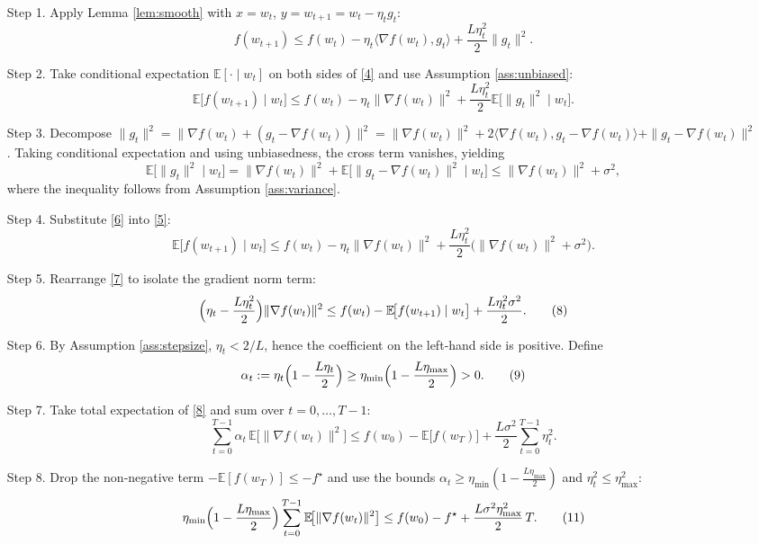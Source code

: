 \documentclass{article}
\newcommand{\E}{\mathbb{E}}
\begin{document}
\begin{enumerate}
\item[Step 1.] Apply Lemma \ref{lem:smooth} with $x=w_t$, $y=w_{t+1}=w_t-\eta_t g_t$:
\[
f(w_{t+1})\le f(w_t)-\eta_t\langle\nabla f(w_t),g_t\rangle
+\frac{L\eta_t^{2}}{2}\|g_t\|^{2}.
\tag{4}
\]

\item[Step 2.] Take conditional expectation $\E[\cdot\mid w_t]$ on both sides
of \eqref{4} and use Assumption \ref{ass:unbiased}:
\[
\E\!\big[f(w_{t+1})\mid w_t\big]
\le f(w_t)-\eta_t\|\nabla f(w_t)\|^{2}
+\frac{L\eta_t^{2}}{2}\E\!\big[\|g_t\|^{2}\mid w_t\big].
\tag{5}
\]

\item[Step 3.] Decompose $\|g_t\|^{2}
=\|\nabla f(w_t)+(g_t-\nabla f(w_t))\|^{2}
=\|\nabla f(w_t)\|^{2}+2\langle\nabla f(w_t),g_t-\nabla f(w_t)\rangle
+\|g_t-\nabla f(w_t)\|^{2}$.
Taking conditional expectation and using unbiasedness,
the cross term vanishes, yielding
\[
\E\!\big[\|g_t\|^{2}\mid w_t\big]
= \|\nabla f(w_t)\|^{2}
+ \E\!\big[\|g_t-\nabla f(w_t)\|^{2}\mid w_t\big]
\le \|\nabla f(w_t)\|^{2}+\sigma^{2},
\tag{6}
\]
where the inequality follows from Assumption \ref{ass:variance}.

\item[Step 4.] Substitute \eqref{6} into \eqref{5}:
\[
\E\!\big[f(w_{t+1})\mid w_t\big]
\le f(w_t)-\eta_t\|\nabla f(w_t)\|^{2}
+\frac{L\eta_t^{2}}{2}\big(\|\nabla f(w_t)\|^{2}+\sigma^{2}\big).
\tag{7}
\]

\item[Step 5.] Rearrange \eqref{7} to isolate the gradient norm term:
\[
\Bigl(\eta_t-\frac{L\eta_t^{2}}{2}\Bigr)\|\nabla f(w_t)\|^{2}
\le f(w_t)-\E\!\big[f(w_{t+1})\mid w_t\big]
+\frac{L\eta_t^{2}\sigma^{2}}{2}.
\tag{8}
\]

\item[Step 6.] By Assumption \ref{ass:stepsize}, $\eta_t<2/L$, hence the
coefficient on the left‑hand side is positive.  Define
\[
\alpha_t:=\eta_t\Bigl(1-\frac{L\eta_t}{2}\Bigr)\ge
\eta_{\min}\Bigl(1-\frac{L\eta_{\max}}{2}\Bigr)>0.
\tag{9}
\]

\item[Step 7.] Take total expectation of \eqref{8} and sum over $t=0,\dots,T-1$:
\[
\sum_{t=0}^{T-1}\alpha_t\,\E\!\big[\|\nabla f(w_t)\|^{2}\big]
\le f(w_0)-\E\!\big[f(w_T)\big]
+\frac{L\sigma^{2}}{2}\sum_{t=0}^{T-1}\eta_t^{2}.
\tag{10}
\]

\item[Step 8.] Drop the non‑negative term $-\E[f(w_T)]\le -f^\star$ and use the
bounds $\alpha_t\ge\eta_{\min}(1-\tfrac{L\eta_{\max}}{2})$ and
$\eta_t^{2}\le\eta_{\max}^{2}$:
\[
\eta_{\min}\Bigl(1-\frac{L\eta_{\max}}{2}\Bigr)
\sum_{t=0}^{T-1}\E\!\big[\|\nabla f(w_t)\|^{2}\big]
\le f(w_0)-f^\star
+\frac{L\sigma^{2}\eta_{\max}^{2}}{2}\,T.
\tag{11}
\]


\end{enumerate}
\end{document}
